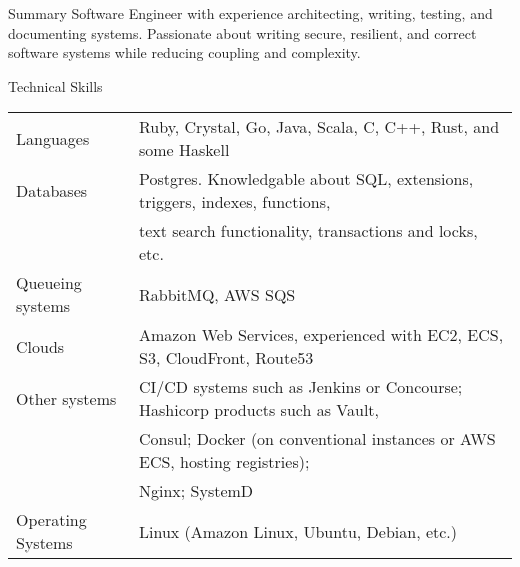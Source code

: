 \documentclass{resume} %
\begin{document}
\begin{rSection}{Summary}
	Software Engineer with experience architecting, writing, testing, and documenting systems.
	Passionate about writing secure, resilient, and correct software systems while reducing coupling and complexity.
\end{rSection}

\begin{rSection}{Technical Skills}
	\begin{table}[h]
		\centering
		\begin{tabular}{ l l }
			Languages & Ruby, Crystal, Go, Java, Scala, C, C++, Rust, and some Haskell \\
			Databases & Postgres. Knowledgable about SQL, extensions, triggers, indexes, functions, \\
			& text search functionality, transactions and locks, etc. \\
			Queueing systems & RabbitMQ, AWS SQS \\
			Clouds & Amazon Web Services, experienced with EC2, ECS, S3, CloudFront, Route53 \\
			Other systems & CI/CD systems such as Jenkins or Concourse; Hashicorp products such as Vault, \\
			& Consul; Docker (on conventional instances or AWS ECS, hosting registries); \\
			& Nginx; SystemD \\
			Operating Systems & Linux (Amazon Linux, Ubuntu, Debian, etc.) \\
		\end{tabular}
	\end{table}
\end{rSection}
\end{document}
